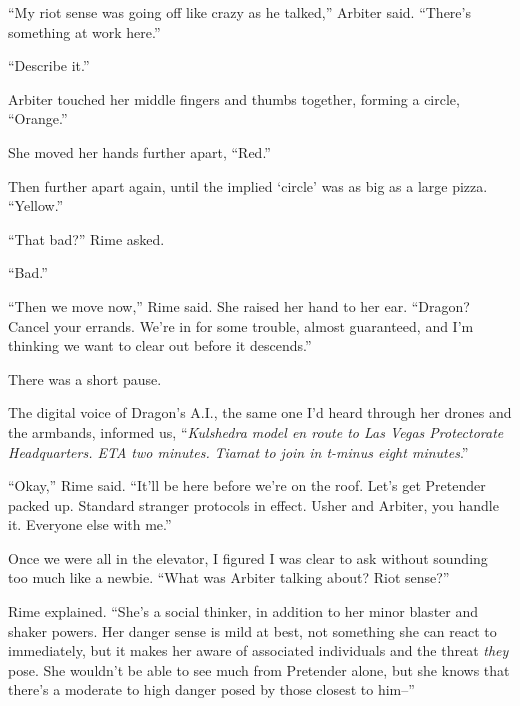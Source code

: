 ``My riot sense was going off like crazy as he talked,'' Arbiter said.  ``There's something at work here.''



``Describe it.''



Arbiter touched her middle fingers and thumbs together, forming a circle, ``Orange.''



She moved her hands further apart, ``Red.''



Then further apart again, until the implied `circle' was as big as a large pizza.  ``Yellow.''



``That bad?''  Rime asked.



``Bad.''



``Then we move now,'' Rime said.  She raised her hand to her ear.  ``Dragon?  Cancel your errands.  We're in for some trouble, almost guaranteed, and I'm thinking we want to clear out before it descends.''



There was a short pause.



The digital voice of Dragon's A.I., the same one I'd heard through her drones and the armbands, informed us, ``\emph{Kulshedra model en route to Las Vegas Protectorate Headquarters.  ETA two minutes.  }\emph{Tiamat }\emph{to join in t-minus eight minutes}.''



``Okay,'' Rime said.  ``It'll be here before we're on the roof.  Let's get Pretender packed up.  Standard stranger protocols in effect.  Usher and Arbiter, you handle it.  Everyone else with me.''



Once we were all in the elevator, I figured I was clear to ask without sounding too much like a newbie.  ``What was Arbiter talking about?  Riot sense?''



Rime explained.  ``She's a social thinker, in addition to her minor blaster and shaker powers.  Her danger sense is mild at best, not something she can react to immediately, but it makes her aware of associated individuals and the threat \emph{they} pose.  She wouldn't be able to see much from Pretender alone, but she knows that there's a moderate to high danger posed by those closest to him--''



